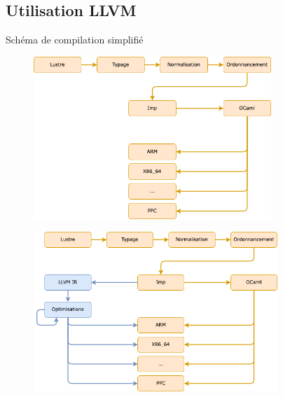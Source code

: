 \documentclass{beamer} %
\begin{document}
\subsection{Utilisation LLVM}

\begin{frame}{Schéma de compilation simplifié}
    \begin{overprint}
        \begin{figure}
            \centering
            \includegraphics[width=0.8\textwidth]{imgs/compilation0.png}
        \end{figure}
        \begin{figure}
            \centering
            \includegraphics[width=0.82\textwidth]{imgs/compilation1.png}
        \end{figure}
    \end{overprint}

\end{frame}
\end{document}
